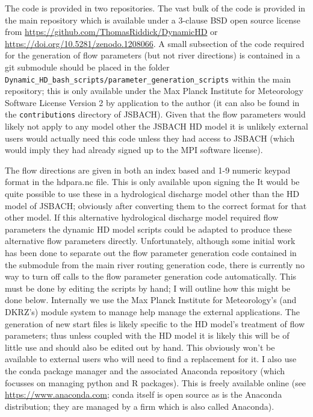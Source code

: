 \documentclass{article}
\begin{document}
The code is provided in two repositories. The vast bulk of the code is provided in the main repository which is available under a 3-clause BSD open source license from \url{https://github.com/ThomasRiddick/DynamicHD} or \url{https://doi.org/10.5281/zenodo.1208066}. A small subsection of the code required for the generation of flow parameters (but not river directions) is contained in a git submodule should be placed in the folder \\\lstinline[style=bash_input]{Dynamic_HD_bash_scripts/parameter_generation_scripts} within the main repository; this is only available under the Max Planck Institute for Meteorology Software License Version 2 by application to the author (it can also be found in the \lstinline[style=bash_input]{contributions} directory of JSBACH). Given that the flow parameters would likely not apply to any model other the JSBACH HD model it is unlikely external users would actually need this code unless they had access to JSBACH (which would imply they had already signed up to the MPI software license).

The flow directions are given in both an index based and 1-9 numeric keypad format in the hdpara.nc file. This is only available upon signing the  It would be quite possible to use these in a hydrological discharge model other than the HD model of JSBACH; obviously after converting them to the correct format for that other model. If this alternative hydrological discharge model required flow parameters the
dynamic HD model scripts could be adapted to produce these alternative flow parameters directly. Unfortunately, although some initial work has been done to separate out the flow parameter generation code contained in the submodule from the main river routing generation code, there is currently no way to turn off calls to the flow parameter generation code automatically. This must be done by editing the scripts by hand; I will outline how this might be done below. Internally we use the Max Planck Institute for Meteorology's (and DKRZ's) module system to manage help manage the external applications. The generation of new start files is likely specific to the HD model's treatment of flow parameters; thus unless coupled with the HD model it is likely this will be of little use and should also be edited out by hand. This obviously won't be available to external users who will need to find a replacement for it. I also use the conda package manager and the associated Anaconda repository (which focusses on managing python and R packages). This is freely available online (see \url{https://www.anaconda.com}; conda itself is open source as is the Anaconda distribution; they are managed by a firm which is also called Anaconda).
\end{document}
